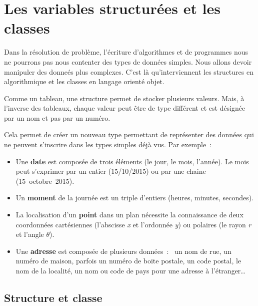 \chapter{Les variables structurées et les classes}

Dans la résolution de problème, l'écriture d'algorithmes et de programmes nous
ne pourrons pas nous contenter des types de données simples. Nous allons devoir
manipuler des donneés plus complexes. C'est là qu'interviennent les structures 
en algorithmique et les classes en langage orienté objet.

Comme un tableau, une structure permet de stocker plusieurs valeurs.  Mais,
à l’inverse des tableaux, chaque valeur peut être de type différent et est
désignée par un nom et pas par un numéro.
		
Cela permet de créer un nouveau type permettant de représenter des données qui
ne peuvent s’inscrire dans les types simples déjà vus.  Par exemple~:

\begin{itemize}

	\item Une \textbf{date} est composée de trois éléments (le jour, le mois,
		l’année). Le mois peut s’exprimer par un entier (15/10/2015) ou par une
		chaine (15~octobre~2015).
	
	\item Un \textbf{moment} de la journée est un triple d’entiers (heures,
		minutes, secondes).
		
	\item La localisation d’un \textbf{point} dans un plan nécessite la
		connaissance de deux coordonnées cartésiennes (l’abscisse \textit{x} et
		l’ordonnée \textit{y}) ou polaires (le rayon \textit{r} et l’angle
		\textit{$\theta$}).
	
	\item Une \textbf{adresse} est composée de plusieurs données~:~ un nom de
		rue, un numéro de maison, parfois un numéro de boite postale, un code
		postal, le nom de la localité, un nom ou code de pays pour une adresse
		à l’étranger\dots
	
\end{itemize}
	
\minitoc

\section{Structure et classe}

